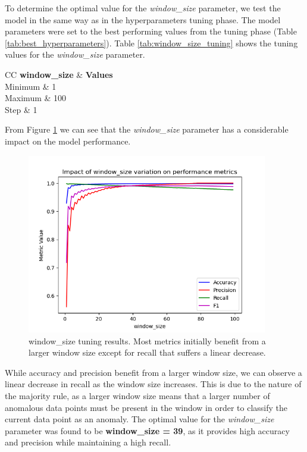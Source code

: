 \documentclass[futureinternet,article,submit,pdftex,moreauthors]{Definitions/mdpi}
\begin{document}
To determine the optimal value for the \textit{window\_size} parameter, we test the model in the same way as in the hyperparameters tuning phase. The model parameters were set to the best performing values from the tuning phase (Table \ref{tab:best_hyperparameters}). Table \ref{tab:window_size_tuning} shows the tuning values for the \textit{window\_size} parameter.

\begin{table}[H]
	\centering
	\caption{window\_size tuning values.}\label{tab:window_size_tuning}
	\begin{tabularx}{\textwidth}{CC}
	\toprule
	\textbf{window\_size} & \textbf{Values} \\
	\midrule
	Minimum & 1 \\
	Maximum & 100 \\
	Step & 1 \\
	\bottomrule
\end{tabularx}
\end{table}

From Figure \ref{fig:window_size_tuning} we can see that the \textit{window\_size} parameter has a considerable impact on the model performance. 
\begin{figure}[H]
	\includegraphics[width=10.5cm]{img/WindowSizeTuning.png}
	\caption{window\_size tuning results. Most metrics initially benefit from a larger window size except for recall that suffers a linear decrease.}\label{fig:window_size_tuning}
\end{figure}


While accuracy and precision benefit from a larger window size, we can observe a linear decrease in recall as the window size increases.
This is due to the nature of the majority rule, as a larger window size means that a larger number of anomalous data points must be present in the window in order to classify the current data point as an anomaly.
The optimal value for the \textit{window\_size} parameter was found to be \textbf{window\_size = 39}, as it provides high accuracy and precision while maintaining a high recall.
\end{document}

